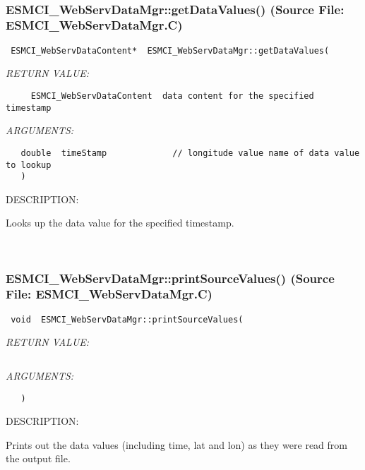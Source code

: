  
\mbox{}\hrulefill\
 
\subsubsection{ESMCI\_WebServDataMgr::getDataValues() (Source File: ESMCI\_WebServDataMgr.C)}


  
\begin{verbatim} ESMCI_WebServDataContent*  ESMCI_WebServDataMgr::getDataValues(\end{verbatim}{\em RETURN VALUE:}
\begin{verbatim}     ESMCI_WebServDataContent  data content for the specified timestamp\end{verbatim}{\em ARGUMENTS:}
\begin{verbatim}   double  timeStamp             // longitude value name of data value to lookup
   )\end{verbatim}
{\sf DESCRIPTION:\\ }


      Looks up the data value for the specified timestamp.
   
 
\mbox{}\hrulefill\
 
\subsubsection{ESMCI\_WebServDataMgr::printSourceValues() (Source File: ESMCI\_WebServDataMgr.C)}


  
\begin{verbatim} void  ESMCI_WebServDataMgr::printSourceValues(\end{verbatim}{\em RETURN VALUE:}
\begin{verbatim} \end{verbatim}{\em ARGUMENTS:}
\begin{verbatim}   )\end{verbatim}
{\sf DESCRIPTION:\\ }


      Prints out the data values (including time, lat and lon) as they were
      read from the output file.
  
\setlength{\parskip}{\oldparskip}
\setlength{\parindent}{\oldparindent}
\setlength{\baselineskip}{\oldbaselineskip}
